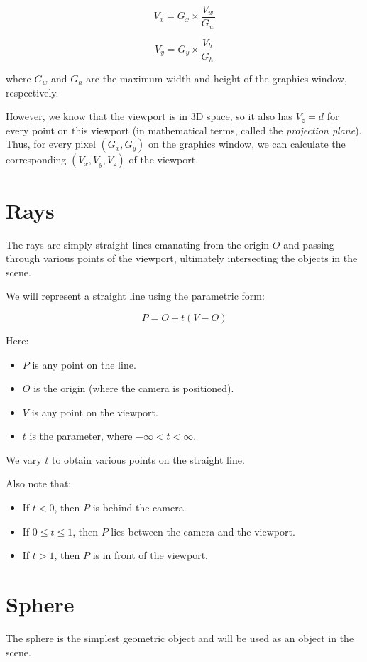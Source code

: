 \documentclass[conference]{IEEEtran}
\begin{document}
$$V_x = G_x \times \frac{V_w}{G_w}$$

$$V_y = G_y \times \frac{V_h}{G_h}$$

where $G_w$ and $G_h$ are the maximum width and height of the graphics window, respectively.

However, we know that the viewport is in 3D space, so it also has $V_z = d$ for every point on this viewport (in mathematical terms, called the \textit{projection plane}). \\
Thus, for every pixel $(G_x, G_y)$ on the graphics window, we can calculate the corresponding $(V_x, V_y, V_z)$ of the viewport.

\section{Rays}

The rays are simply straight lines emanating from the origin $O$ and passing through various points of the viewport, ultimately intersecting the objects in the scene.

We will represent a straight line using the parametric form:

$$P = O + t(V - O)$$

Here:
\begin{itemize}
    \item $P$ is any point on the line.
    \item $O$ is the origin (where the camera is positioned).
    \item $V$ is any point on the viewport.
    \item $t$ is the parameter, where $-\infty < t < \infty$.
\end{itemize}

We vary $t$ to obtain various points on the straight line.

Also note that:
\begin{itemize}
    \item If $t < 0$, then $P$ is behind the camera.
    \item If $0 \leq t \leq 1$, then $P$ lies between the camera and the viewport.
    \item If $t > 1$, then $P$ is in front of the viewport.
\end{itemize}

\section{Sphere}

The sphere is the simplest geometric object and will be used as an object in the scene.
\end{document}
